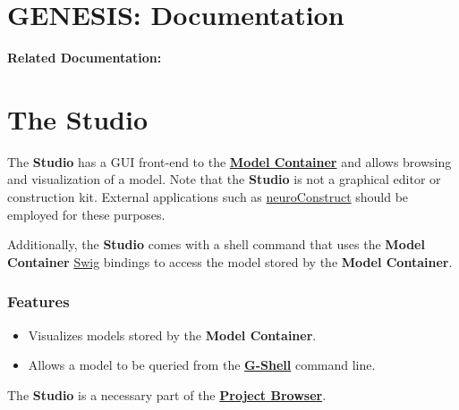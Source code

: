 \documentclass[12pt]{article}
\begin{document}
\section*{GENESIS: Documentation}

{\bf Related Documentation:}


\section*{The Studio}

The {\bf Studio} has a GUI front-end to the \href{../model-container/model-container.tex}{\bf Model Container} and allows browsing and visualization of a model. Note that the {\bf Studio} is not a graphical editor or construction kit. External applications such as \href{http://www.physiol.ucl.ac.uk/research/silver\_a/neuroConstruct/}{neuroConstruct} should be employed for these purposes.

Additionally, the {\bf Studio} comes with a shell command that uses the {\bf Model Container} \href{http://www.swig.org/}{Swig} bindings to access the model stored by the {\bf Model Container}.

\subsubsection*{Features}

\begin{itemize}

\item Visualizes models stored by the {\bf Model Container}.

\item  Allows a model to be queried from the \href{../gshell/gshell.tex}{\bf G-Shell} command line.

\end{itemize}
The {\bf Studio} is a necessary part of the \href{../project-browser/project-browser.tex}{\bf Project Browser}.
\end{document}
